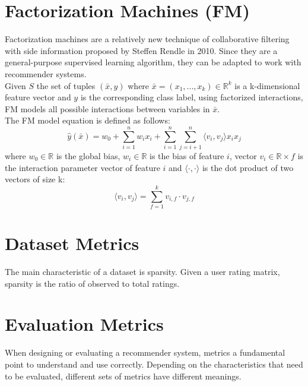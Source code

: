 \section{Factorization Machines (FM)}
\label{factorization-machines}

Factorization machines \cite{10.1109/ICDM.2010.127} are a relatively new technique of collaborative filtering with side information proposed by Steffen Rendle in 2010. Since they are a general-purpose supervised learning algorithm, they can be adapted to work with recommender systems.\\
Given $S$ the set of tuples $(\bar{x}, y)$ where $\bar{x} = (x_1, ..., x_k) \in \mathbb{R}^k$ is a k-dimensional feature vector and $y$ is the corresponding class label, using factorized interactions, FM models all possible interactions between variables in $\bar{x}$.\\
The FM model equation is defined as follows:
\begin{equation*}
\hat{y}(\bar{x}) = w_0 + \sum_{i = 1}^{n} w_i x_i + \sum_{i = 1}^{n} \sum_{j = i + 1}^{n} \langle v_i, v_j \rangle x_i x_j
\end{equation*}
where $w_0 \in \mathbb{R}$ is the global bias, $w_i \in \mathbb{R}$ is the bias of feature $i$, vector $v_i \in \mathbb{R} \times f$ is the interaction parameter vector of feature $i$ and $\langle \cdot, \cdot \rangle$ is the dot product of two vectors of size k:
\begin{equation*}
\langle v_i, v_j \rangle = \sum_{f = 1}^{k} v_{i,f} \cdot v_{j,f}
\end{equation*}



\section{Dataset Metrics}

The main characteristic of a dataset is sparsity. Given a user rating matrix, sparsity is the ratio of observed to total ratings. %



\section{Evaluation Metrics}

When designing or evaluating a recommender system, metrics a fundamental point to understand and use correctly. Depending on the characteristics that need to be evaluated, different sets of metrics have different meanings.


